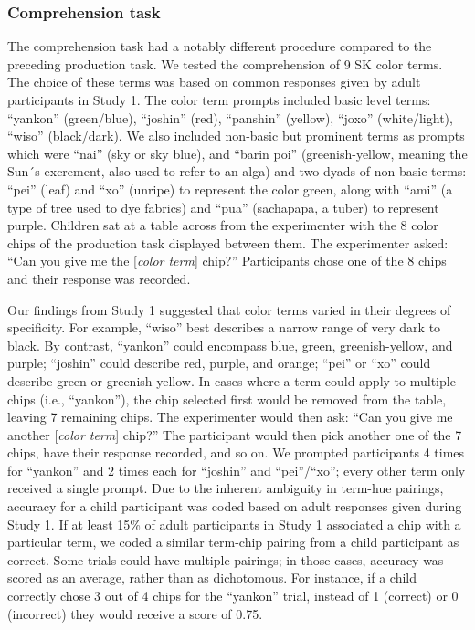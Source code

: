 \documentclass[
  english,
  ,apa7,floatsintext]{apa6}
\begin{document}
\hypertarget{comprehension-task}{%
\subsubsection{Comprehension task}\label{comprehension-task}}

The comprehension task had a notably different procedure compared to the preceding production task. We tested the comprehension of 9 SK color terms. The choice of these terms was based on common responses given by adult participants in Study 1. The color term prompts included basic level terms: ``yankon'' (green/blue), ``joshin'' (red), ``panshin'' (yellow), ``joxo'' (white/light), ``wiso'' (black/dark). We also included non-basic but prominent terms as prompts which were ``nai'' (sky or sky blue), and ``barin poi'' (greenish-yellow, meaning the Sun´s excrement, also used to refer to an alga) and two dyads of non-basic terms: ``pei'' (leaf) and ``xo'' (unripe) to represent the color green, along with ``ami'' (a type of tree used to dye fabrics) and ``pua'' (sachapapa, a tuber) to represent purple. Children sat at a table across from the experimenter with the 8 color chips of the production task displayed between them. The experimenter asked: ``Can you give me the {[}\emph{color term}{]} chip?'' Participants chose one of the 8 chips and their response was recorded.

Our findings from Study 1 suggested that color terms varied in their degrees of specificity. For example, ``wiso'' best describes a narrow range of very dark to black. By contrast, ``yankon'' could encompass blue, green, greenish-yellow, and purple; ``joshin'' could describe red, purple, and orange; ``pei'' or ``xo'' could describe green or greenish-yellow. In cases where a term could apply to multiple chips (i.e., ``yankon''), the chip selected first would be removed from the table, leaving 7 remaining chips. The experimenter would then ask: ``Can you give me another {[}\emph{color term}{]} chip?'' The participant would then pick another one of the 7 chips, have their response recorded, and so on. We prompted participants 4 times for ``yankon'' and 2 times each for ``joshin'' and ``pei''/``xo''; every other term only received a single prompt. Due to the inherent ambiguity in term-hue pairings, accuracy for a child participant was coded based on adult responses given during Study 1. If at least 15\% of adult participants in Study 1 associated a chip with a particular term, we coded a similar term-chip pairing from a child participant as correct. Some trials could have multiple pairings; in those cases, accuracy was scored as an average, rather than as dichotomous. For instance, if a child correctly chose 3 out of 4 chips for the ``yankon'' trial, instead of 1 (correct) or 0 (incorrect) they would receive a score of 0.75.
\end{document}
